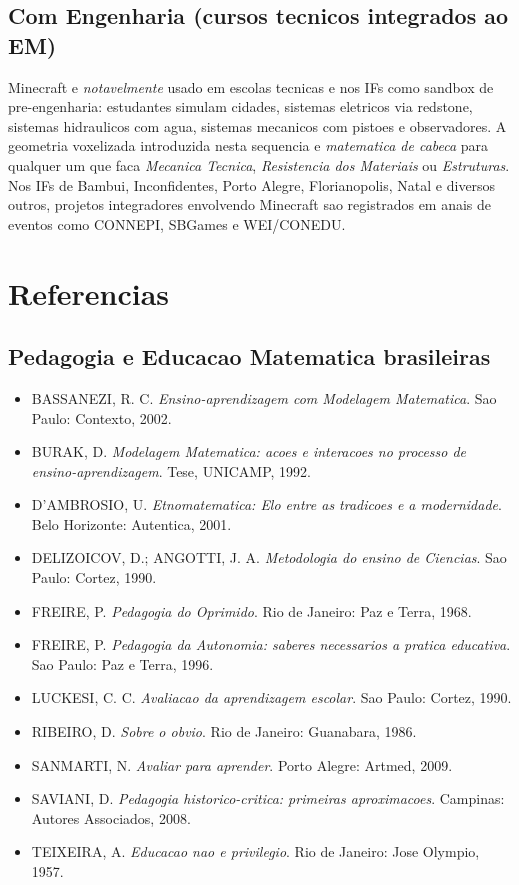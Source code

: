 \documentclass[12pt,a4paper]{scrartcl}
\begin{document}
\subsection{Com Engenharia (cursos tecnicos integrados ao EM)}
Minecraft e \emph{notavelmente} usado em escolas tecnicas e nos IFs como sandbox de pre-engenharia: estudantes simulam cidades, sistemas eletricos via redstone, sistemas hidraulicos com agua, sistemas mecanicos com pistoes e observadores. A geometria voxelizada introduzida nesta sequencia e \emph{matematica de cabeca} para qualquer um que faca \emph{Mecanica Tecnica}, \emph{Resistencia dos Materiais} ou \emph{Estruturas}. Nos IFs de Bambui, Inconfidentes, Porto Alegre, Florianopolis, Natal e diversos outros, projetos integradores envolvendo Minecraft sao registrados em anais de eventos como CONNEPI, SBGames e WEI/CONEDU.

\section{Referencias}\label{sec:referencias}

\subsection{Pedagogia e Educacao Matematica brasileiras}
\begin{itemize}[leftmargin=1.3em,itemsep=0.15em,topsep=0.3em]
  \item BASSANEZI, R. C. \emph{Ensino-aprendizagem com Modelagem Matematica}. Sao Paulo: Contexto, 2002.
  \item BURAK, D. \emph{Modelagem Matematica: acoes e interacoes no processo de ensino-aprendizagem}. Tese, UNICAMP, 1992.
  \item D'AMBROSIO, U. \emph{Etnomatematica: Elo entre as tradicoes e a modernidade}. Belo Horizonte: Autentica, 2001.
  \item DELIZOICOV, D.; ANGOTTI, J. A. \emph{Metodologia do ensino de Ciencias}. Sao Paulo: Cortez, 1990.
  \item FREIRE, P. \emph{Pedagogia do Oprimido}. Rio de Janeiro: Paz e Terra, 1968.
  \item FREIRE, P. \emph{Pedagogia da Autonomia: saberes necessarios a pratica educativa}. Sao Paulo: Paz e Terra, 1996.
  \item LUCKESI, C. C. \emph{Avaliacao da aprendizagem escolar}. Sao Paulo: Cortez, 1990.
  \item RIBEIRO, D. \emph{Sobre o obvio}. Rio de Janeiro: Guanabara, 1986.
  \item SANMARTI, N. \emph{Avaliar para aprender}. Porto Alegre: Artmed, 2009.
  \item SAVIANI, D. \emph{Pedagogia historico-critica: primeiras aproximacoes}. Campinas: Autores Associados, 2008.
  \item TEIXEIRA, A. \emph{Educacao nao e privilegio}. Rio de Janeiro: Jose Olympio, 1957.
\end{itemize}
\end{document}
